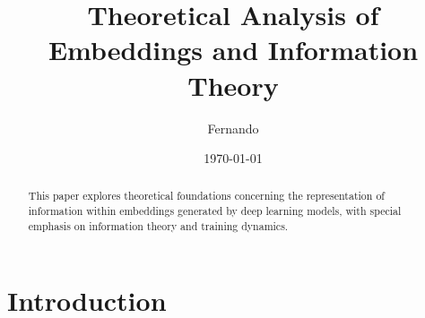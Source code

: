 \documentclass[a4paper,12pt]{article}
\title{Theoretical Analysis of Embeddings and Information Theory}
\author{Fernando}
\date{\today}
\begin{document}
\maketitle

\begin{abstract}
This paper explores theoretical foundations concerning the representation of information within embeddings generated by deep learning models, with special emphasis on information theory and training dynamics.
\end{abstract}

\section{Introduction}
\end{document}
